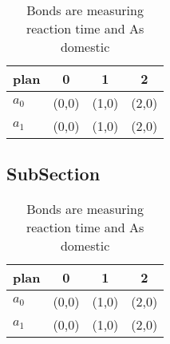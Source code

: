 \documentclass[a4paper]{article}
\begin{document}
\begin{table}
\begin{adjustbox}{width=0.6\columnwidth}
\begin{tabular}{|l|l|l|l|}
\hline
\textbf{plan} & \multicolumn{1}{c|}{\textbf{0}} & \multicolumn{1}{c|}{\textbf{1}} & \multicolumn{1}{c|}{\textbf{2}} \\ \hline
\textbf{$a_0$}  & (0,0) & (1,0) & (2,0) \\ \hline
\textbf{$a_1$}  & (0,0) & (1,0) & (2,0) \\ \hline
\end{tabular}
\end{adjustbox}
\caption{Bonds are measuring reaction time and As domestic
}
\end{table}

\subsection{SubSection}

\begin{table}
\begin{adjustbox}{width=0.6\columnwidth}
\begin{tabular}{|l|l|l|l|}
\hline
\textbf{plan} & \multicolumn{1}{c|}{\textbf{0}} & \multicolumn{1}{c|}{\textbf{1}} & \multicolumn{1}{c|}{\textbf{2}} \\ \hline
\textbf{$a_0$}  & (0,0) & (1,0) & (2,0) \\ \hline
\textbf{$a_1$}  & (0,0) & (1,0) & (2,0) \\ \hline
\end{tabular}
\end{adjustbox}
\caption{Bonds are measuring reaction time and As domestic
}
\end{table}
\end{document}
